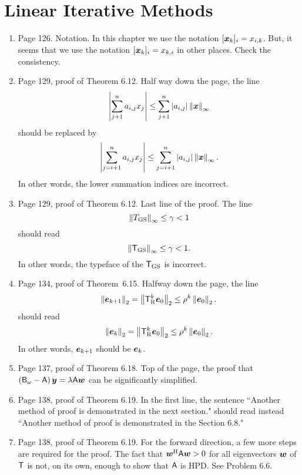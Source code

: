 \documentclass{book}
\begin{document}
	\chapter{Linear Iterative Methods}
	
	\begin{enumerate}
	\item
Page 126. Notation. In this chapter we use the notation $[\boldsymbol{x}_k]_i = x_{i,k}$. But, it seems that we use the notation $[\boldsymbol{x}_k]_i = x_{k,i}$ in other places. Check the consistency.

	\item
Page 129, proof of Theorem 6.12. Half way down the page, the line
	\[
\left|\sum_{j+1}^n a_{i,j} x_j  \right|	\le \sum_{j+1}^n|a_{i,j}| \left\| \boldsymbol{x} \right\|_\infty
	\]
should be replaced by 
	\[
\left|\sum_{j=i+1}^n a_{i,j} x_j  \right|	\le \sum_{j=i+1}^n|a_{i,j}| \left\| \boldsymbol{x} \right\|_\infty .
	\]
In other words, the lower summation indices are incorrect.

	\item
Page 129, proof of Theorem 6.12. Last line of the proof. The line
	\[
\left\| T_{\rm GS} \right\|_\infty \le \gamma < 1	
	\]
should read
	\[
\left\| \mathsf{T}_{\rm GS} \right\|_\infty \le \gamma < 1	.
	\]
In other words, the typeface of the $\mathsf{T}_{\rm GS}$ is incorrect.

	\item
Page 134, proof of Theorem~6.15. Halfway down the page, the line
	\[
\left\| \boldsymbol{e}_{k+1} \right\|_2 = \left\| \mathsf{T}_{\rm R}^k\boldsymbol{e}_0 \right\|_2 \le \rho^k\left\| \boldsymbol{e}_0 \right\|_2.
	\]
should read
	\[
\left\| \boldsymbol{e}_k \right\|_2 = \left\| \mathsf{T}_{\rm R}^k\boldsymbol{e}_0 \right\|_2 \le \rho^k\left\| \boldsymbol{e}_0 \right\|_2.
	\]
In other words, $\boldsymbol{e}_{k+1}$ should be $\boldsymbol{e}_k$.


 	
 	\item
 Page 137, proof of Theorem 6.18. Top of the page, the proof that $\left(\mathsf{B}_\omega - \mathsf{A}\right)\boldsymbol{y} = \lambda\mathsf{A}\boldsymbol{w}$ can be significantly simplified.
 
 	\item
 Page 138, proof of Theorem 6.19. In the first line, the sentence ``Another method of proof is demonstrated in the next section." should read instead ``Another method of proof is demonstrated in the Section 6.8."

	\item
Page 138, proof of Theorem 6.19. For the forward direction, a few more steps are required for the proof. The fact that $\boldsymbol{w}^{\textup{H}}\mathsf{A}\boldsymbol{w} >0$ for all eigenvectors $\boldsymbol{w}$ of $\mathsf{T}$ is not, on its own, enough to show that $\mathsf{A}$ is HPD. See Problem 6.6.


\end{enumerate}
\end{document}
